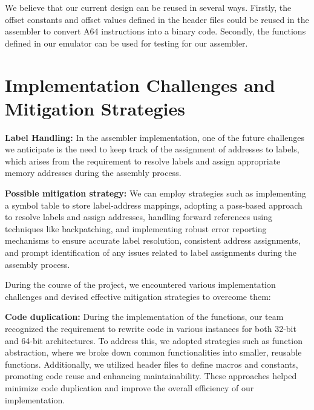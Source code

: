 \documentclass{article}
\begin{document}
    We believe that our current design can be reused in several ways. Firstly, the offset constants and offset values defined in the header files could be reused in the assembler to convert A64 instructions into a binary code. Secondly, the functions defined in our emulator can be used for testing for our assembler.
    \section{Implementation Challenges and Mitigation Strategies}


    \textbf{Label Handling: }In the assembler implementation, one of the future challenges we anticipate is the need to keep track of the assignment of addresses to labels, which arises from the requirement to resolve labels and assign appropriate memory addresses during the assembly process.

     \textbf{Possible mitigation strategy: }We can employ strategies such as implementing a symbol table to store label-address mappings, adopting a pass-based approach to resolve labels and assign addresses, handling forward references using techniques like backpatching, and implementing robust error reporting mechanisms to ensure accurate label resolution, consistent address assignments, and prompt identification of any issues related to label assignments during the assembly process.

    

     During the course of the project, we encountered various implementation challenges and devised effective mitigation strategies to overcome them:
    

    \textbf{Code duplication:} During the implementation of the functions, our team recognized the requirement to rewrite code in various instances for both 32-bit and 64-bit architectures. To address this, we adopted strategies such as function abstraction, where we broke down common functionalities into smaller, reusable functions. Additionally, we utilized header files to define macros and constants, promoting code reuse and enhancing maintainability. These approaches helped minimize code duplication and improve the overall efficiency of our implementation.
\end{document}
